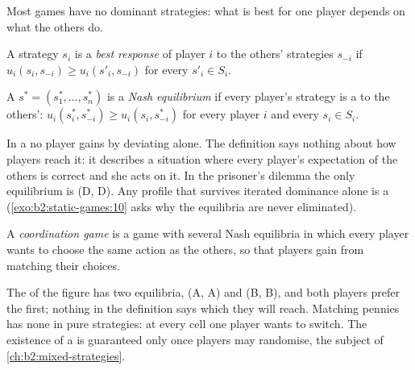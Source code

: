 Most games have no dominant strategies: what is best for one player depends on what the others do.

\begin{definition}\label{def:b2:static-games:best-response}
A strategy $s_i$ is a \emph{best response} of player $i$ to the others' strategies
$s_{-i}$ if $u_i(s_i, s_{-i}) \ge u_i(s'_i, s_{-i})$ for every $s'_i \in S_i$.
\end{definition}

\begin{definition}\label{def:b2:static-games:nash-equilibrium}
A  $s^* = (s^*_1, \dots, s^*_n)$ is a \emph{Nash equilibrium} if
every player's strategy is a  to the others': $u_i(s^*_i, s^*_{-i}) \ge u_i(s_i, s^*_{-i})$
for every player $i$ and every $s_i \in S_i$.
\end{definition}

In a  no player gains by deviating alone. The definition says nothing about how players
reach it: it describes a situation where every player's expectation of the others is correct and she acts
on it. In the prisoner's dilemma the only equilibrium is (D, D). Any profile that survives iterated
dominance alone is a  (\cref{exo:b2:static-games:10} asks why the equilibria are never
eliminated).

\begin{definition}\label{def:b2:static-games:coordination-game}
A \emph{coordination game} is a game with several Nash equilibria in which every
player wants to choose the same action as the others, so that players gain from matching their choices.
\end{definition}

The  of the figure has two equilibria, (A, A) and (B, B), and both players prefer the
first; nothing in the definition says which they will reach. Matching pennies has none in pure
strategies: at every cell one player wants to switch. The existence of a  is guaranteed
only once players may randomise, the subject of \cref{ch:b2:mixed-strategies}.

